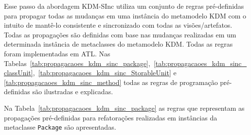Esse passo da abordagem KDM-SInc utiliza um conjunto de regras pré-definidas para propagar todas as mudanças em uma instância do metamodelo KDM com o intuito de mantê-lo consistente e sincronizado com todas as visões/artefatos. Todas as propagações são definidas com base nas mudanças realizadas em um determinada instância de metaclasses do metamodelo KDM. Todas as regras foram implementadas em ATL. Nas Tabelas~\ref{tab:propagacaoes_kdm_sinc_package},~\ref{tab:propagacaoes_kdm_sinc_classUnit},~\ref{tab:propagacaoes_kdm_sinc_StorableUnit} e \ref{tab:propagacaoes_kdm_sinc_method} todas as regras de programação pré-definidas são ilustradas e explicadas.  

Na Tabela~\ref{tab:propagacaoes_kdm_sinc_package} as regras que representam as propagações pré-definidas para refatorações realizadas em instâncias da metaclasse \texttt{Package} são apresentadas.

